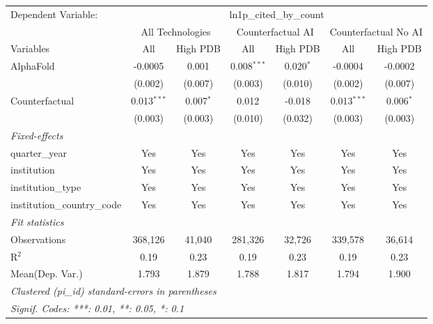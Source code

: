 \begingroup
\centering
\begin{tabular}{lcccccc}
   \tabularnewline \midrule \midrule
   Dependent Variable: & \multicolumn{6}{c}{ln1p\_cited\_by\_count}\\
 & \multicolumn{2}{c}{All Technologies} & \multicolumn{2}{c}{Counterfactual AI} & \multicolumn{2}{c}{Counterfactual No AI} \\
\cmidrule(lr){1-1}\cmidrule(lr){2-3} \cmidrule(lr){4-5} \cmidrule(lr){6-7}
Variables & \multicolumn{1}{c}{All} & \multicolumn{1}{c}{High PDB} & \multicolumn{1}{c}{All} & \multicolumn{1}{c}{High PDB} & \multicolumn{1}{c}{All} & \multicolumn{1}{c}{High PDB} \\
\cmidrule(lr){1-1}\cmidrule(lr){2-2} \cmidrule(lr){3-3} \cmidrule(lr){4-4} \cmidrule(lr){5-5} \cmidrule(lr){6-6} \cmidrule(lr){7-7}
   AlphaFold                    & -0.0005       & 0.001       & 0.008$^{***}$ & 0.020$^{*}$ & -0.0004       & -0.0002\\   
                                & (0.002)       & (0.007)     & (0.003)       & (0.010)     & (0.002)       & (0.007)\\   
   Counterfactual               & 0.013$^{***}$ & 0.007$^{*}$ & 0.012         & -0.018      & 0.013$^{***}$ & 0.006$^{*}$\\   
                                & (0.003)       & (0.003)     & (0.010)       & (0.032)     & (0.003)       & (0.003)\\   
   \midrule
   \emph{Fixed-effects}\\
   quarter\_year                & Yes           & Yes         & Yes           & Yes         & Yes           & Yes\\  
   institution                  & Yes           & Yes         & Yes           & Yes         & Yes           & Yes\\  
   institution\_type            & Yes           & Yes         & Yes           & Yes         & Yes           & Yes\\  
   institution\_country\_code   & Yes           & Yes         & Yes           & Yes         & Yes           & Yes\\  
   \midrule
   \emph{Fit statistics}\\
   Observations                 & 368,126       & 41,040      & 281,326       & 32,726      & 339,578       & 36,614\\  
   R$^2$                        & 0.19          & 0.23        & 0.19          & 0.23        & 0.19          & 0.23\\  
Mean(Dep. Var.) & 1.793 & 1.879 & 1.788 & 1.817 & 1.794 & 1.900 \\
   \midrule \midrule
   \multicolumn{7}{l}{\emph{Clustered (pi\_id) standard-errors in parentheses}}\\
   \multicolumn{7}{l}{\emph{Signif. Codes: ***: 0.01, **: 0.05, *: 0.1}}\\
\end{tabular}
\par\endgroup
